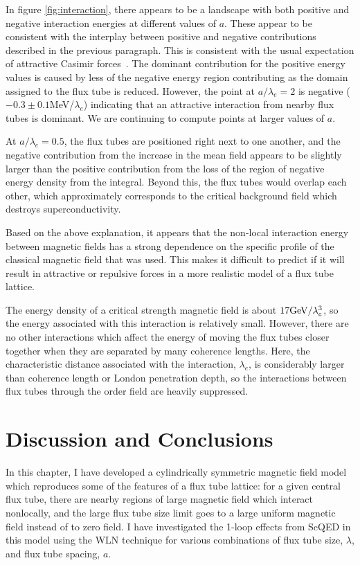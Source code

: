 In figure \ref{fig:interaction}, there appears to be a landscape with both 
positive and negative interaction energies at different values of $a$. 
These appear to be consistent with the interplay between positive and 
negative contributions described in the previous paragraph. This is consistent with 
the usual expectation of attractive Casimir forces~\cite{duru1993}. The dominant contribution 
for the positive energy values is caused by less of the negative energy region contributing 
as the domain assigned to the flux tube is reduced. However, the point at $a/\lambda_e = 2$ is 
negative ($-0.3\pm0.1$MeV/$\lambda_e$) indicating that an attractive interaction from 
nearby flux tubes is dominant. 
We are continuing to compute points at larger values of $a$. 

At $a/\lambda_e = 0.5$, 
the flux tubes are positioned right next to one another, and the negative 
contribution from the increase in the mean field appears to be 
slightly larger than the positive contribution from the loss of the 
region of negative energy density from the integral. Beyond
this, the flux tubes would overlap each other, which approximately corresponds 
to the critical background field which destroys superconductivity.

Based on the above explanation, it appears that the non-local 
interaction energy between magnetic fields has a strong dependence on 
the specific profile of the classical magnetic field that was used. 
This makes it difficult to predict if it will result in attractive 
or repulsive forces
in a more realistic model of a flux tube lattice. 

The energy density of a 
critical strength magnetic field is about $17{\rm GeV}/\lambda_e^3$, 
so the energy associated with this interaction is relatively small. 
However, there are no other interactions which affect the 
energy of moving the flux tubes closer together when they are 
separated by many coherence lengths. Here, the characteristic 
distance associated with the interaction, $\lambda_e$, is considerably 
larger than coherence length or London penetration depth, so the 
interactions between flux tubes through the order field are heavily 
suppressed. 


\section{Discussion and Conclusions}

In this chapter, I have developed a cylindrically symmetric magnetic field 
model which reproduces some of the 
features of a flux tube lattice: for a given central flux tube, there are 
nearby regions of large magnetic field which interact nonlocally, and 
the large flux tube size limit goes to a large uniform magnetic field
instead of to zero field. I have investigated the 1-loop effects from 
\ac{ScQED} in this model using the \ac{WLN} technique for various 
combinations of flux tube size, $\lambda$, and flux tube spacing, $a$.

